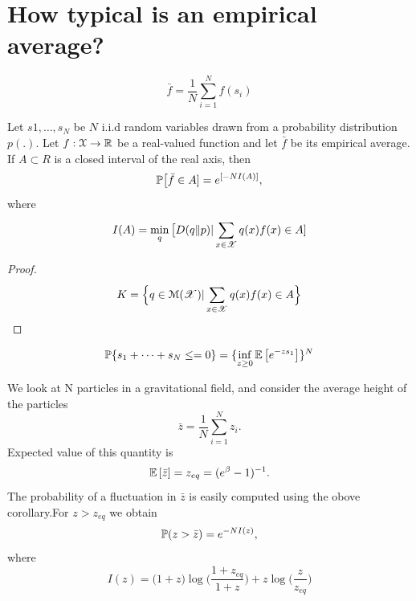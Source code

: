 \documentclass[letterpaper,english,12pt]{article}
\begin{document}
 \section{How typical is an empirical average?}
 \begin{equation}
     \bar{f} = \frac{1}{N}\sum_{i=1}^{N}f(s_i)
 \end{equation}
 \begin{cor}
 Let $s1,\dots ,s_N$ be $N$ i.i.d random variables drawn from a probability distribution $p(.)$. Let $f:\mathcal{X}\rightarrow \R$ be a real-valued  function and let $\bar{f}$ be its empirical average. If $A\subset R$ is a closed interval of the real axis, then 
 \begin{equation}
     \P\big[\bar{f}\in A]= e^{[-NI(A)]},
 \end{equation}
 where
 \begin{equation}
     I(A)=\min_q\big[D(q\Vert p)| \sum_{x\in \sX}^{} q(x)f(x) \in A]
 \end{equation}
 \end{cor}
 \begin{proof}
 
 \begin{equation}
     K= \Big\{ q\in \mathcal{M}(\sX)|\sum_{x\in \sX}^{} q(x)f(x) \in A \Big\}
 \end{equation}
 \end{proof}
 
 \begin{exmp}
   \begin{equation}
       \P \{s_1 + \dots + s_N \leq  = 0\} = \{ \inf_{z\geq 0} \E {e^{-zs_1}}  \}^N
   \end{equation}
     
 \end{exmp}
 
 \begin{exmp}
   We look at N particles in a gravitational field, and consider the average height of the particles 
   \begin{equation}
       \bar{z}= \dfrac{1}{N}\sum_{i=1}^{N}z_i.
    \end{equation}
     Expected value of this quantity  is 
       \begin{equation}
           \E{\bar{z}}= z_{eq}= (e^\beta -1)^{-1}.
           \end{equation}
           The probability of a fluctuation in $\bar{z}$ is easily computed using the obove corollary.For $z>z_{eq}$ we obtain 
           \begin{equation}
               \P(z>\bar{z}) = e^{-NI(z)},
           \end{equation}
           where 
           \begin{equation}
               I(z) = \big(1+z\big)\log \big( \dfrac{1+z_{eq}}{1+z}\big) + z\log{\big(\dfrac{z}{z_{eq}}\big)}
           \end{equation}
           
       
   
 \end{exmp}
\end{document}
